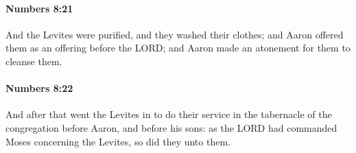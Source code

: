 		\paragraph{Numbers 8:21} %
			\label{NUMBERS-8-21}

			And the Levites were purified, and they washed their clothes; and Aaron offered them as an offering before the LORD; and Aaron made an atonement for them to cleanse them.


		\paragraph{Numbers 8:22} %
			\label{NUMBERS-8-22}

			And after that went the Levites in to do their service in the tabernacle of the congregation before Aaron, and before his sons: as the LORD had commanded Moses concerning the Levites, so did they unto them.

